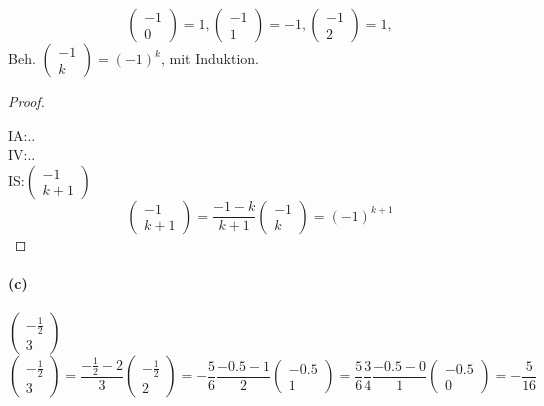 \begin{equation*}
\begin{pmatrix}
-1\\
0
\end{pmatrix}=1,
\begin{pmatrix}
-1\\
1
\end{pmatrix}=-1,
\begin{pmatrix}
-1\\
2
\end{pmatrix}=1,
\end{equation*}
Beh. $\begin{pmatrix}
-1\\
k
\end{pmatrix}=(-1)^k$, mit Induktion.
\begin{proof}
$ $\newline

IA:..\\

IV:..\\

IS:$\begin{pmatrix}
-1\\
k+1
\end{pmatrix}$
\begin{equation*}
\begin{pmatrix}
-1\\
k+1
\end{pmatrix}=\frac{-1-k}{k+1}
\begin{pmatrix}
-1\\
k
\end{pmatrix}=(-1)^{k+1}
\end{equation*}
\end{proof}

\paragraph{(c)}
$\begin{pmatrix}
-\frac{1}{2}\\
3
\end{pmatrix}$
\begin{equation*}
\begin{pmatrix}
-\frac{1}{2}\\
3
\end{pmatrix}
=\frac{-\frac{1}{2}-2}{3}
\begin{pmatrix}
-\frac{1}{2}\\
2
\end{pmatrix}
=-\frac{5}{6}\frac{-0.5-1}{2}
\begin{pmatrix}
-0.5\\
1
\end{pmatrix}
=\frac{5}{6}\frac{3}{4}\frac{-0.5-0}{1}
\begin{pmatrix}
-0.5\\
0
\end{pmatrix}
=-\frac{5}{16}
\end{equation*}

